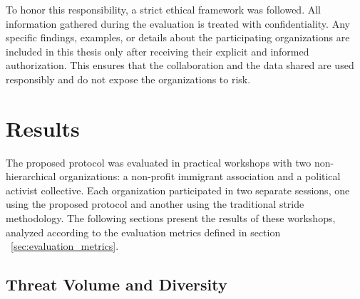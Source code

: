 To honor this responsibility, a strict ethical framework was followed. All
information gathered during the evaluation is treated with
confidentiality. Any specific findings, examples, or details about the
participating organizations are included in this thesis only after receiving
their explicit and informed authorization. This ensures that the collaboration
and the data shared are used responsibly and do not expose the organizations to
risk.

\section{Results}
\label{sec:results}

The proposed protocol was evaluated in practical workshops with two non-hierarchical
organizations: a non-profit immigrant association and a political activist collective.
Each organization participated in two separate sessions, one using the
proposed protocol and another using the traditional \gls{stride} methodology.
The following sections present the results of these workshops, analyzed according to the
evaluation metrics defined in section ~\ref{sec:evaluation_metrics}.

\subsection{Threat Volume and Diversity}
\label{subsec:threat_volumediversity}



